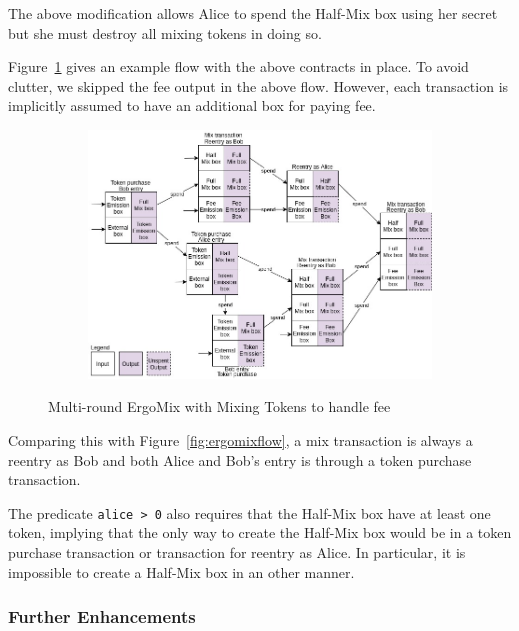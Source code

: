 \documentclass[runningheads]{llncs}
\newcommand{\mixname}{ErgoMix\xspace}
\begin{document}
The above modification allows Alice to spend the Half-Mix box using her secret but she must destroy all mixing tokens in doing so. 

Figure~\ref{fig:mixingtokens} gives an example flow with the above contracts in place. To avoid clutter, we skipped the fee output in the above flow. However, each transaction is implicitly assumed to have an additional box for paying fee.

\begin{figure}[h]
	\centering
	\begin{subfigure}{0.9\textwidth}
		\centering
		\includegraphics[width=\linewidth]{MixingTokens.jpg}
	\end{subfigure}
	\caption{Multi-round \mixname with Mixing Tokens to handle fee}
\label{fig:mixingtokens}
\end{figure}

Comparing this with Figure~\ref{fig:ergomixflow}, a mix transaction is always a reentry as Bob and both Alice and Bob's entry is through a token purchase transaction. 

The predicate \texttt{alice > 0} also requires that the Half-Mix box have at least one token, implying that the only way to create the Half-Mix box would be in a token purchase transaction or transaction for reentry as Alice. In particular, it is impossible to create a Half-Mix box in an other manner.

\subsubsection{Further Enhancements}
\end{document}
